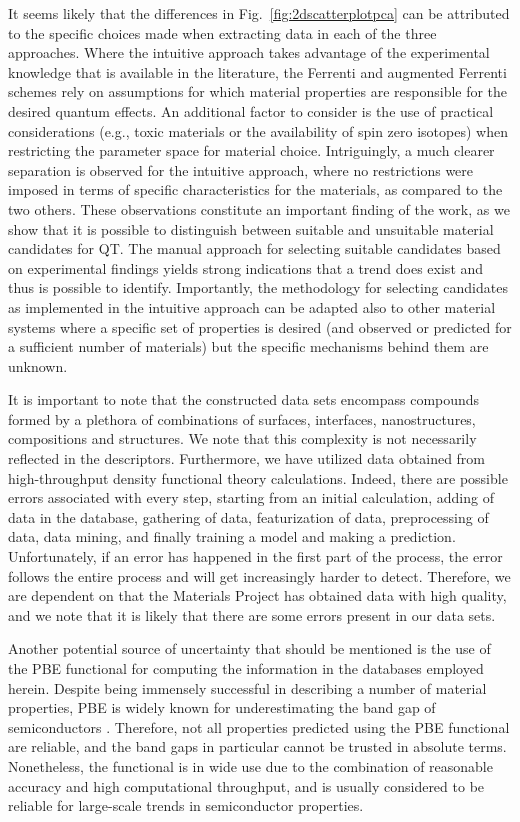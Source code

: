 \documentclass[superscriptaddress,unsortedaddress,
 amsmath,amssymb,
 aps,
]{revtex4-2}
\begin{document}
It seems likely that the differences in Fig.~\ref{fig:2dscatterplotpca} can be attributed to the specific choices made when extracting data in each of the three approaches. Where the intuitive approach takes advantage of the experimental knowledge that is available in the literature, the Ferrenti and augmented Ferrenti schemes rely on assumptions for which material properties are responsible for the desired quantum effects.   
An additional factor to consider is the use of practical considerations (e.g., toxic materials or the availability of spin zero isotopes) when restricting the parameter space for material choice. 
Intriguingly, a much clearer separation is observed for the intuitive approach, where no restrictions were imposed in terms of specific characteristics for the materials, as compared to the two others. 
These observations constitute an important finding of the work, as we show that it is possible to distinguish between suitable and unsuitable material candidates for QT. The manual approach for selecting suitable candidates based on experimental findings yields strong indications that a trend does exist and thus is possible to identify. 
Importantly, the methodology for selecting candidates as implemented in the intuitive approach can be adapted also to other material systems where a specific set of properties is desired (and observed or predicted for a sufficient number of materials) but the specific mechanisms behind them are unknown. 

It is important to note that the constructed data sets encompass compounds formed by a plethora of combinations of surfaces, interfaces, nanostructures, compositions and structures. We note that this complexity is not necessarily reflected in the descriptors. 
Furthermore, we have utilized data obtained from high-throughput density functional theory calculations. Indeed, there are possible errors associated with every step, starting from an initial calculation, adding of data in the database, gathering of data, featurization of data, preprocessing of data, data mining, and finally training a model and making a prediction. Unfortunately, if an error has happened in the first part of the process, the error follows the entire process and will get increasingly harder to detect. Therefore, we are dependent on that the Materials Project has obtained data with high quality, and we note that it is likely that there are some errors present in our data sets.

Another potential source of uncertainty that should be mentioned is the use of the PBE functional for computing the information in the databases employed herein. Despite being immensely successful in describing a number of material properties, PBE is widely known for underestimating the band gap of semiconductors \cite{Freysoldt2014}. Therefore, not all properties predicted using the PBE functional are reliable, and the band gaps in particular cannot be trusted in absolute terms. Nonetheless, the functional is in wide use due to the combination of reasonable accuracy and high computational throughput, and is usually considered to be reliable for large-scale trends in semiconductor properties. 
\end{document}

